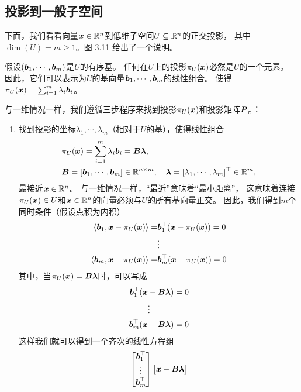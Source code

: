 \subsection{投影到一般子空间}
下面，我们看看向量$\boldsymbol{x} \in \mathbb{R}^n$到低维子空间$U \subseteq \mathbb{R}^n$的正交投影，
其中$\dim(U) = m \geqslant 1$。图 3.11 给出了一个说明。

假设$(\boldsymbol{b}_1,\cdots,\boldsymbol{b}_m)$是$U$的有序基。
任何在$U$上的投影$\pi_U(\boldsymbol{x})$必然是$U$的一个元素。
因此，它们可以表示为$U$的基向量$\boldsymbol{b}_1,\cdots,\boldsymbol{b}_m$的线性组合。
使得$\pi_U(\boldsymbol{x}) = \sum_{i=1}^{m}\lambda_i\boldsymbol{b}_i$。

与一维情况一样，我们遵循三步程序来找到投影$\pi_U(\boldsymbol{x})$和投影矩阵$\boldsymbol{P}_\pi$：
\begin{enumerate}
\item 找到投影的坐标$\lambda_1,\cdots,\lambda_m$（相对于$U$的基），使得线性组合
    \begin{align}
        &\pi_U(\boldsymbol{x}) = \sum_{i=1}^{m}\lambda_i\boldsymbol{b}_i = \boldsymbol{B}\boldsymbol{\lambda},\\
        &\boldsymbol{B} = [\boldsymbol{b}_1,\cdots,\boldsymbol{b}_m] \in \mathbb{R}^{n\times m},
        \quad
        \boldsymbol{\lambda} = [\lambda_1,\cdots,\lambda_m]^\top \in \mathbb{R}^m,
    \end{align}
    最接近$\boldsymbol{x} \in \mathbb{R}^n$。
    与一维情况一样，“最近”意味着“最小距离”，
    这意味着连接$\pi_U (\boldsymbol{x}) \in U$和$\boldsymbol{x} \in \mathbb{R}^n$的向量必须与$U$的所有基向量正交。
    因此，我们得到$m$个同时条件（假设点积为内积）
    \begin{align}
        \left\langle\boldsymbol{b}_1,\boldsymbol{x} - \pi_U(\boldsymbol{x})\right\rangle =& \boldsymbol{b}_1^\top(\boldsymbol{x} - \pi_U(\boldsymbol{x})) = 0\\
        &\vdots \notag\\
        \left\langle\boldsymbol{b}_m,\boldsymbol{x} - \pi_U(\boldsymbol{x})\right\rangle =& \boldsymbol{b}_m^\top(\boldsymbol{x} - \pi_U(\boldsymbol{x})) = 0
    \end{align}
    其中，当$\pi_U (\boldsymbol{x}) = \boldsymbol{B}\boldsymbol{\lambda}$时，可以写成
    \begin{align}
        \boldsymbol{b}_1^\top(\boldsymbol{x}& - \boldsymbol{B}\boldsymbol{\lambda}) = 0 \\
        &\vdots \notag\\
        \boldsymbol{b}_m^\top(\boldsymbol{x}& - \boldsymbol{B}\boldsymbol{\lambda}) = 0
    \end{align}
    这样我们就可以得到一个齐次的线性方程组
    \begin{align}
        \begin{bmatrix}
            \boldsymbol{b}_1^\top \\ \vdots \\ \boldsymbol{b}_m^\top
        \end{bmatrix}
        \begin{bmatrix}
            \boldsymbol{x} - \boldsymbol{B}\boldsymbol{\lambda}

\end{bmatrix}
\end{align}
\end{enumerate}
